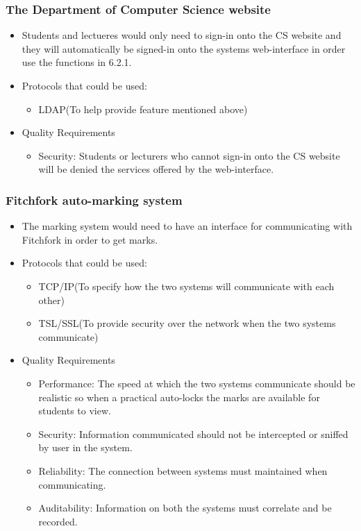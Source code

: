\documentclass[11pt,a4paper]{article}
\begin{document}
	\subsubsection{The Department of Computer Science website}
		\begin{itemize}
		\item Students and lectueres would only need to sign-in onto the CS website and they will automatically be signed-in onto the systems web-interface in order use the functions in 6.2.1.
		\item Protocols that could be used:
			\begin{itemize}
			\item LDAP(To help provide feature mentioned above)
			\end{itemize} 
		\item Quality Requirements	
			\begin{itemize}
			\item Security: Students or lecturers who cannot sign-in onto the CS website will be denied the services offered by the web-interface.
			\end{itemize}
	\end{itemize}
	
	\subsubsection{Fitchfork auto-marking system}
		\begin{itemize}
			\item The marking system would need to have an interface for communicating with Fitchfork in order to get marks.
			\item Protocols that could be used:
				\begin{itemize}
				\item TCP/IP(To specify how the two systems will communicate with each other)
				\item TSL/SSL(To provide security over the network when the two systems communicate)
				\end{itemize}	
			\item Quality Requirements
				\begin{itemize}
				\item Performance: The speed at which the two systems communicate should be realistic so when a practical auto-locks the marks are available for students to view.
				\item Security: Information communicated should not be intercepted or sniffed by user in the system.
				\item Reliability: The connection between systems must maintained when communicating.
				\item Auditability: Information on both the systems must correlate and be recorded. 	   
				\end{itemize}
		\end{itemize}
	
\end{document}
